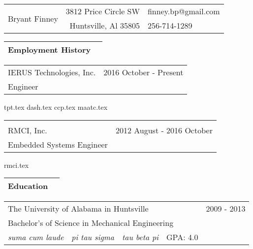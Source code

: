 \documentclass[10pt,a4paper]{article}
\begin{document}
\begin{table}
  \noindent\begin{tabularx}{\textwidth}{Xr|l}
    \toprule
    \multirow{2}{*}{\Huge Bryant Finney} & 3812 Price Circle SW & finney.bp@gmail.com \\
                                                  & Huntsville, Al 35805 & 256-714-1289 \\
    \bottomrule
  \end{tabularx}
\end{table}

\noindent\begin{tabularx}{\textwidth}{Xr}
  \Large Employment History & \\
  \bottomrule
\end{tabularx}
\smallskip

\noindent\begin{tabularx}{\textwidth}{Xr}
  IERUS Technologies, Inc. & 2016 October - Present \\
  Engineer & \\
\end{tabularx}
\smallskip

\bigskip

{tpt.tex}
{dash.tex}
{ccp.tex}
{maatc.tex}

\noindent\begin{tabularx}{\textwidth}{Xr}
  \Large \\ \bottomrule \\
  RMCI, Inc. & 2012 August - 2016 October \\
  Embedded Systems Engineer & \\
\end{tabularx}
\smallskip

{rmci.tex}

\noindent\begin{tabularx}{\textwidth}{Xr}
  \Large Education & \\
  \bottomrule
\end{tabularx}
\smallskip

\noindent\begin{tabularx}{\textwidth}{cccXr}
  \multicolumn{3}{l}{The University of Alabama in Huntsville} & & 2009 - 2013 \\
  \multicolumn{5}{l}{\hspace{.125in} Bachelor's of Science in Mechanical Engineering} \\
  \hspace{.125in} \textit{suma cum laude} & \textit{pi tau sigma} & \textit{tau beta pi} & GPA: 4.0 \\
\end{tabularx}
\bigskip
\end{document}
